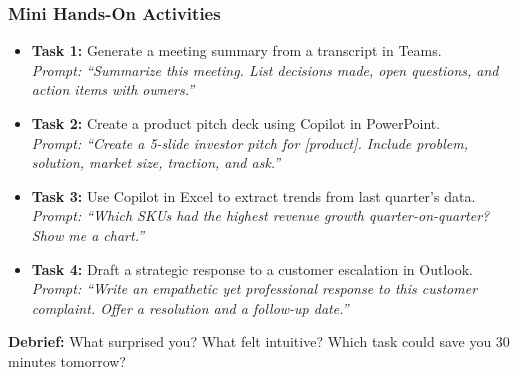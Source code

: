 \begin{frame}[fragile]\frametitle{Mini Hands-On Activities}

\begin{itemize}
  \item \textbf{Task 1:} Generate a meeting summary from a transcript in Teams.\\
    \textit{Prompt: ``Summarize this meeting. List decisions made, open questions, and action items with owners.''}
  \item \textbf{Task 2:} Create a product pitch deck using Copilot in PowerPoint.\\
    \textit{Prompt: ``Create a 5-slide investor pitch for [product]. Include problem, solution, market size, traction, and ask.''}
  \item \textbf{Task 3:} Use Copilot in Excel to extract trends from last quarter's data.\\
    \textit{Prompt: ``Which SKUs had the highest revenue growth quarter-on-quarter? Show me a chart.''}
  \item \textbf{Task 4:} Draft a strategic response to a customer escalation in Outlook.\\
    \textit{Prompt: ``Write an empathetic yet professional response to this customer complaint. Offer a resolution and a follow-up date.''}
\end{itemize}

\vspace{0.3em}
\textbf{Debrief:} What surprised you? What felt intuitive? Which task could save you 30 minutes tomorrow?

\end{frame}

